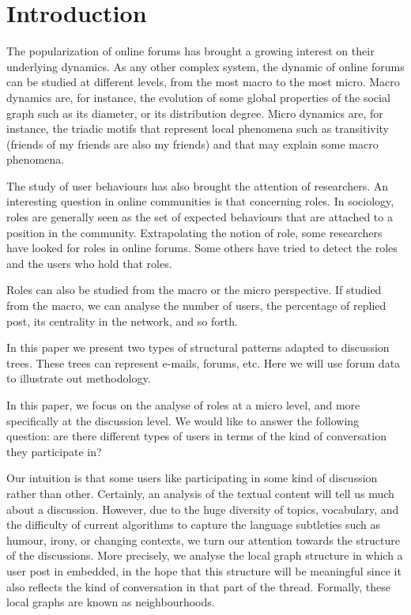 \documentclass[conference]{IEEEtran}
\begin{document}
\section{Introduction}
The popularization of online forums has brought a growing interest on their underlying dynamics. As any other complex system, the dynamic of online forums can be studied at different levels, from the most macro to the most micro. Macro dynamics are, for instance, the evolution of some global properties of the social graph such as its diameter, or its distribution degree. Micro dynamics are, for instance, the triadic motifs that represent local phenomena such as transitivity (friends of my friends are also my friends) and that may explain some macro phenomena.

The study of user behaviours has also brought the attention of researchers. 
An interesting question in online communities is that concerning roles. In sociology, roles are generally seen as the set of expected behaviours that are attached  to a position in the community. Extrapolating the notion of role, some researchers have looked for roles in online forums. Some others have tried to detect the roles and the users who hold that roles.

Roles can also be studied from the macro or the micro perspective. If studied from the macro, we can analyse the number of users, the percentage of replied post, its centrality in the network, and  so forth.

In this paper we present two types of structural patterns adapted to discussion trees. These trees can represent e-mails, forums, etc. Here we will use forum data to illustrate out methodology. 

In this paper, we focus on the analyse of roles at a micro level, and more specifically at the discussion level. We would like to answer the following question: are there different types of users in terms of the kind of conversation they participate in?

Our intuition is that some users like participating in some kind of discussion rather than other. Certainly, an analysis of the textual content will tell us much about a discussion. However, due to the huge diversity of topics, vocabulary, and the difficulty of current algorithms to capture the language subtleties such as humour, irony, or changing contexts, we turn our attention towards the structure of the discussions. More precisely, we analyse the local graph structure in which a user post in embedded, in the hope that this structure will be meaningful since it also reflects the kind of conversation in that part of the thread. Formally, these local graphs are known as neighbourhoods.
\end{document}
